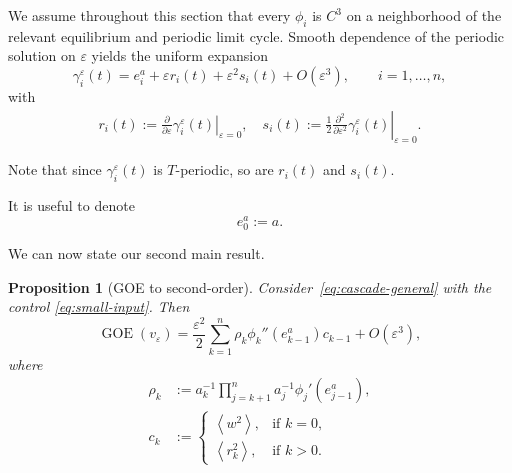 \documentclass[onecolumn]{IEEEtran}
\newcommand{\GOE}{\operatorname{GOE}}
\newcommand{\avg}[1]{\left\langle #1\right\rangle}
\newtheorem{proposition}[theorem]{Proposition}
\begin{document}
We assume throughout this section that every $\phi_i$ is $C^3$ on a
neighborhood of the relevant equilibrium and periodic limit cycle. 
Smooth
dependence of the periodic solution on $\varepsilon$ yields the uniform
expansion
\begin{equation}
    \gamma_i^\varepsilon(t)
    =
    e_i^a+\varepsilon r_i(t)
    +\varepsilon^2s_i(t)
    +O(\varepsilon^3),
    \qquad i=1,\ldots,n,
    \label{eq:orbit-expansion}
\end{equation}
with
\begin{align}\label{eq:defrisi}
    r_i(t)
    :=
    \left.
    \frac{\partial } 
    {\partial\varepsilon}\gamma_i^\varepsilon(t)
    \right|_{\varepsilon=0},
\quad
    s_i(t)
    :=
    \frac{1}{2}
    \left.
    \frac{\partial^2 } 
    {\partial\varepsilon^2}\gamma_i^\varepsilon(t)
    \right|_{\varepsilon=0}.
\end{align}
% 

Note that since $\gamma_ i ^\varepsilon(t)$ is $T$-periodic, so are $r_i (t) $ and $s_i(t)$. 

It is useful to denote
\[
e^a_0:=a.
\]

We can now state our second main result. 
\begin{proposition}[GOE to second-order]
\label{prop:second-order}
Consider~\eqref{eq:cascade-general} with the control   \eqref{eq:small-input}. Then 
\begin{equation}
    \GOE(v_\varepsilon)
    =
    \frac{\varepsilon^2}{2}
    \sum_{k=1}^n
    \rho_k \phi_k''(e_{k-1}^a) c_{k-1}
    +
    O(\varepsilon^3),
    \label{eq:second-order-goe}
\end{equation}
where
\begin{align}\label{eq:defck}
    \rho_k
   & :=
    a_k^{-1}
    \prod_{j=k+1}^n a_j^{-1} \phi_j'(e_{j-1}^a) ,\nonumber \\
     c_k&:= \begin{cases}
     \avg{ w^2 }, & \text {if }      k=0,\\
     \avg{r_{k }^2} , & \text {if }      k>0. 
     \end{cases}
 \end{align}
\end{proposition}
\end{document}
